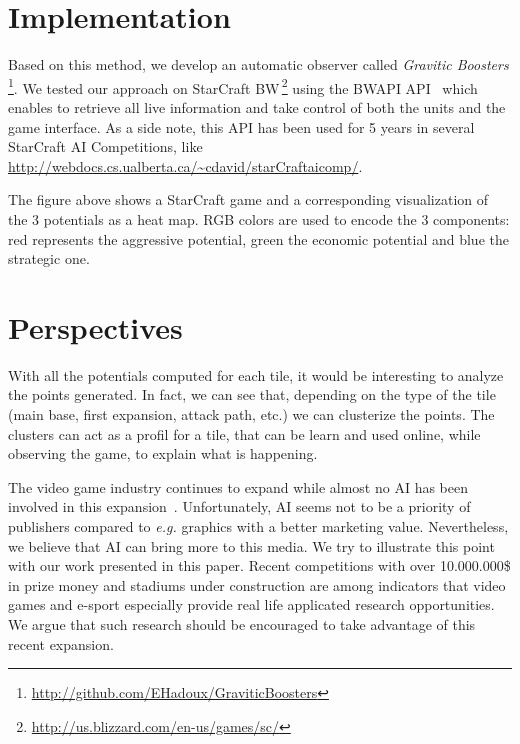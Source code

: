 \documentclass{jfsma}
\begin{document}
\section{Implementation}

Based on this method, we develop an automatic observer called \emph{Gravitic Boosters}\,\footnote{\url{http://github.com/EHadoux/GraviticBoosters}}.
We tested our approach on StarCraft BW\,\footnote{\url{http://us.blizzard.com/en-us/games/sc/}} using
the BWAPI API~\cite{bwapi} which enables to retrieve all live information and take control of both the units and the game interface.
As a side note, this API has been used for 5 years in several StarCraft AI Competitions, like \url{http://webdocs.cs.ualberta.ca/~cdavid/starCraftaicomp/}. %

The figure above shows a StarCraft game and a corresponding visualization of the 3 potentials as a heat map.
RGB colors are used to encode the 3 components: red represents the aggressive potential, green the economic potential and blue the strategic one.

\section{Perspectives}
With all the potentials computed for each tile, it would be interesting to analyze the points generated.
In fact, we can see that, depending on the type of the tile (main base, first expansion, attack path, etc.) we can clusterize the points.
The clusters can act as a profil for a tile, that can be learn and used online, while observing the game, to explain what is happening.

The video game industry continues to expand while almost no AI has been involved in this expansion~\cite{miikkulainen2007creating}.
Unfortunately, AI seems not to be a priority of publishers compared to \textit{e.g.} graphics with a better marketing value.
Nevertheless, we believe that AI can bring more to this media.
We try to illustrate this point with our work presented in this paper.
Recent competitions with over 10.000.000\$ in prize money and stadiums under construction are among indicators that video games and e-sport especially provide real life applicated research opportunities.
We argue that such research should be encouraged to take advantage of this recent expansion.



\end{document}
